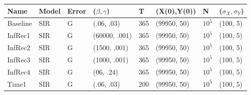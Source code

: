 \documentclass[12pt]{article}
\begin{document}
\begin{table}[]
\centering
\begin{tabular}{@{}llllllll@{}}
\toprule
\textbf{Name} & \textbf{Model} & \textbf{Error} & \textbf{($\beta, \gamma$)} & \textbf{T} & \textbf{(X(0),Y(0))} & \textbf{N} & \textbf{($\sigma_X, \sigma_Y$)} \\ \midrule
  Baseline        & SIR      &   G             & (.06, .03)                          &     365       &  (99950, 50)                    &  $10^5$          &(100, 5)                                \\ \midrule
  InfRec1       & SIR      &   G             & (60000, .001)                          &     365       &  (99950, 50)                    &  $10^5$          &(100, 5)\\
  InfRec2      & SIR      &   G             & (1500, .001)                          &     365       &  (99950, 50)                    &  $10^5$          &(100, 5)                                \\
  InfRec3      & SIR      &   G             & (1000, .001)                          &     365       &  (99950, 50)                    &  $10^5$          &(100, 5)                                \\
InfRec4      & SIR      &   G             & (06, .24)                          &     365       &  (99950, 50)                    &  $10^5$          &(100, 5)                                \\ \midrule
  Time1 & SIR &  G   & (.06, .03)                          &     200       &  (99950, 50)                    &  $10^5$          &(100, 5)                                \\

\end{tabular}
\end{table}
\end{document}
